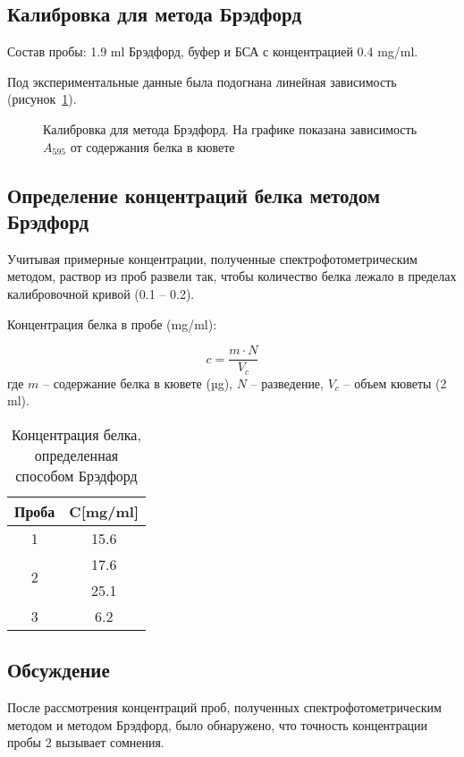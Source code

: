 \subsection{Калибровка для метода Брэдфорд}
\label{A0k}

Состав пробы: 1.9 ml Брэдфорд, буфер и БСА с концентрацией 0.4 mg/ml.

Под экспериментальные данные была подогнана линейная зависимость
(рисунок~\ref{fig-calibration}).

\begin{figure}[htbp]

\caption{Калибровка для метода Брэдфорд.
    На графике показана зависимость $A_{595}$ от содержания белка в кювете}
\label{fig-calibration}
\end{figure}

\subsection{Определение концентраций белка методом Брэдфорд}

Учитывая примерные концентрации, полученные спектрофотометрическим методом,
раствор из проб развели так, чтобы количество белка лежало в пределах
калибровочной кривой (0.1 -- 0.2).

Концентрация белка в пробе (mg/ml):

$$ c = \frac{m \cdot N}{V_c} $$
где $m$ -- содержание белка в кювете (µg),
$N$ -- разведение,
$V_c$ -- объем кюветы (2 ml).

\begin{table}[htbp]
\caption{Концентрация белка, определенная способом Брэдфорд}
\begin{tabular}{|c|c|}
\hline
Проба & C[mg/ml] \\
\hline
1 & 15.6 \\
\hline
\multirow{2}{*}{2} & 17.6 \\
& 25.1 \\
\hline
3 & 6.2 \\
\hline
\end{tabular}
\label{table-bredford}
\end{table}

\subsection{Обсуждение}
После рассмотрения концентраций проб, полученных спектрофотометрическим методом
и методом Брэдфорд, было обнаружено, что точность концентрации пробы 2 вызывает
сомнения.

